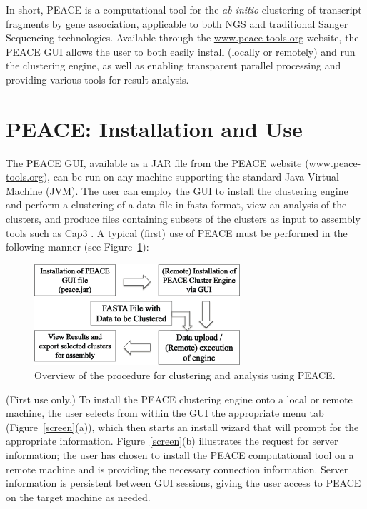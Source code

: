 \documentclass[a4,center,fleqn]{NAR}
\newcommand{\peace} {{\small PEACE}}
\newcommand{\capthree} {{\small Cap3}}
\begin{document}
In short, \peace\/ is a computational tool for the {\it ab initio}
clustering of transcript fragments by gene association, applicable to
both NGS and traditional Sanger Sequencing technologies.  Available
through the \href{http://www.peace-tools.org}{www.peace-tools.org}
website, the \peace\/ GUI allows the user to both easily install
(locally or remotely) and run the clustering engine, as well as
enabling transparent parallel processing and providing various tools
for result analysis.

\section{\peace: Installation and Use}

The \peace\/ GUI, available as a {\small JAR} file from the \peace\/
website (\href{http://www.peace-tools.org}{www.peace-tools.org}),
can be run on any machine supporting the standard Java Virtual
Machine (JVM).  The user can employ the GUI to install
the clustering engine and perform a clustering of a data file in {\sc
  fasta} format, view an analysis of the clusters, and produce
files containing subsets of the clusters as input to assembly tools
such as \capthree\/ \cite{Huang99}.  A typical (first) use of \peace\/
must be performed in the following manner (see
Figure~\ref{fig:workflow}):

\begin{figure}
  \centerline{\includegraphics[width=3in]{pics.d/workflow.png}}
  \caption{Overview of the procedure for clustering and analysis using
    \peace.}\label{fig:workflow}
\end{figure}


 (First use only.) To install the
\peace\/ clustering engine onto a local or remote machine, the user selects
from within the GUI the appropriate menu tab (Figure~\ref{screen}(a)),
which then starts an install wizard that will prompt for the
appropriate information.  Figure~\ref{screen}(b) illustrates the
request for server information; the user has chosen to install the
\peace\/ computational tool on a remote machine and is providing
the necessary connection information.  Server information is
persistent between GUI sessions, giving the user access to \peace\/
on the target machine as needed.
\end{document}
